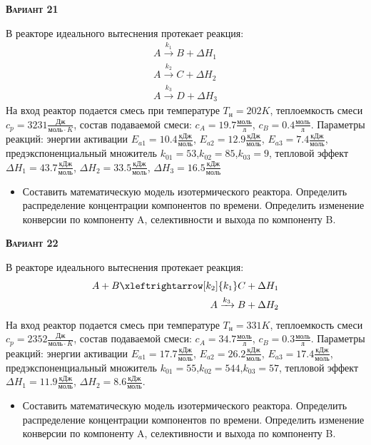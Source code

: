 \textsc{\textbf{Вариант 21}}

 В реакторе идеального вытеснения протекает реакция: \begin{equation*} \begin{aligned} A \xrightarrow{k_1} B + \Delta H_1 \\ A \xrightarrow{k_2} C + \Delta H_2 \\ A \xrightarrow{k_3} D + \Delta H_3 \end{aligned} \end{equation*} На вход  реактор подается смесь при температуре $ T_{н} =  202 K$, теплоемкость смеси $c_p= 3231 \frac{Дж}{моль \cdot K}$, состав подаваемой смеси: $c_A=19.7 \frac{моль}{л}$, $c_B=0.4 \frac{моль}{л}$. Параметры реакций: энергии активации $E_{a1}=10.4 \frac{кДж}{моль}$, $E_{a2}=12.9  \frac{кДж}{моль}$, $E_{a3}= 7.4  \frac{кДж}{моль}$, предэкспоненциальный множитель $k_{01}=        53$,$k_{02}=        85$,$k_{03}=         9$, тепловой эффект $\Delta H_1= 43.7 \frac{кДж}{моль}$, $\Delta H_2=33.5 \frac{кДж}{моль}$, $\Delta H_3 = 16.5 \frac{кДж}{моль}$\begin{itemize} \item Составить математическую модель изотермического реактора. Определить распределение концентрации компонентов по времени. Определить изменение конверсии по компоненту A, селективности и выхода по компоненту B. \end{itemize}

\textsc{\textbf{Вариант 22}}

 В реакторе идеального вытеснения протекает реакция: \begin{equation*} \begin{aligned} A+B \xleftrightarrow[k_2]{k_1} C +\Delta H_1 \\ A \xrightarrow{k_3} B + \Delta H_2 \end{aligned} \end{equation*}                             На вход  реактор подается смесь при температуре $ T_{н} =  331 K$, теплоемкость смеси $c_p= 2352 \frac{Дж}{моль \cdot K}$, состав подаваемой смеси: $c_A=34.7 \frac{моль}{л}$, $c_B=0.3 \frac{моль}{л}$. Параметры реакций: энергии активации $E_{a1}=17.7 \frac{кДж}{моль}$, $E_{a2}=26.2  \frac{кДж}{моль}$, $E_{a3}=17.4  \frac{кДж}{моль}$, предэкспоненциальный множитель $k_{01}=        55$,$k_{02}=       544$,$k_{03}=        57$, тепловой эффект $\Delta H_1= 11.9  \frac{кДж}{моль}$, $\Delta H_2= 8.6 \frac{кДж}{моль}$.\begin{itemize} \item Составить математическую модель изотермического реактора. Определить распределение концентрации компонентов по времени. Определить изменение конверсии по компоненту A, селективности и выхода по компоненту B. \end{itemize}

